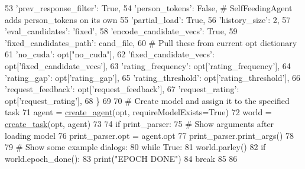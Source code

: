\begin{DoxyCode}
53         \textcolor{stringliteral}{'prev\_response\_filter'}: \textcolor{keyword}{True},
54         \textcolor{stringliteral}{'person\_tokens'}: \textcolor{keyword}{False},  \textcolor{comment}{# SelfFeedingAgent adds person\_tokens on its own}
55         \textcolor{stringliteral}{'partial\_load'}: \textcolor{keyword}{True},
56         \textcolor{stringliteral}{'history\_size'}: 2,
57         \textcolor{stringliteral}{'eval\_candidates'}: \textcolor{stringliteral}{'fixed'},
58         \textcolor{stringliteral}{'encode\_candidate\_vecs'}: \textcolor{keyword}{True},
59         \textcolor{stringliteral}{'fixed\_candidates\_path'}: cand\_file,
60         \textcolor{comment}{# Pull these from current opt dictionary}
61         \textcolor{stringliteral}{'no\_cuda'}: opt[\textcolor{stringliteral}{"no\_cuda"}],
62         \textcolor{stringliteral}{'fixed\_candidate\_vecs'}: opt[\textcolor{stringliteral}{'fixed\_candidate\_vecs'}],
63         \textcolor{stringliteral}{'rating\_frequency'}: opt[\textcolor{stringliteral}{'rating\_frequency'}],
64         \textcolor{stringliteral}{'rating\_gap'}: opt[\textcolor{stringliteral}{'rating\_gap'}],
65         \textcolor{stringliteral}{'rating\_threshold'}: opt[\textcolor{stringliteral}{'rating\_threshold'}],
66         \textcolor{stringliteral}{'request\_feedback'}: opt[\textcolor{stringliteral}{'request\_feedback'}],
67         \textcolor{stringliteral}{'request\_rating'}: opt[\textcolor{stringliteral}{'request\_rating'}],
68     \}
69 
70     \textcolor{comment}{# Create model and assign it to the specified task}
71     agent = \hyperlink{namespaceparlai_1_1core_1_1agents_a00d77a7e26fb89e8bd900f7b2a02982a}{create\_agent}(opt, requireModelExists=\textcolor{keyword}{True})
72     world = \hyperlink{namespaceparlai_1_1core_1_1worlds_a79969c7ba76d4b3c500f5bb776444dc6}{create\_task}(opt, agent)
73 
74     \textcolor{keywordflow}{if} print\_parser:
75         \textcolor{comment}{# Show arguments after loading model}
76         print\_parser.opt = agent.opt
77         print\_parser.print\_args()
78 
79     \textcolor{comment}{# Show some example dialogs:}
80     \textcolor{keywordflow}{while} \textcolor{keyword}{True}:
81         world.parley()
82         \textcolor{keywordflow}{if} world.epoch\_done():
83             print(\textcolor{stringliteral}{"EPOCH DONE"})
84             \textcolor{keywordflow}{break}
85 
86 
\end{DoxyCode}
\mbox{\label{namespaceprojects_1_1self__feeding_1_1interactive_a2ad3b874d9caef6e76ea41e029b933f0}} 
